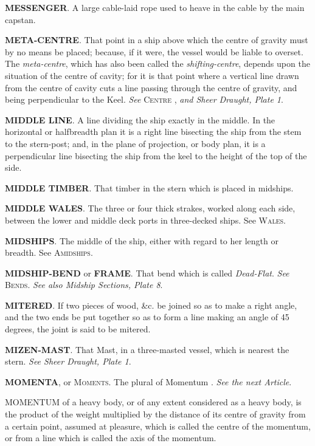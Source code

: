 \textbf{MESSENGER}. A large cable-laid rope used to heave in the cable by the main capstan. 

\textbf{META-CENTRE}. That point in a ship above which the centre of gravity must by no means be placed; because, if it were, the vessel would be liable to overset. The \textit{meta-centre}, which has also been called the \textit{shifting-centre}, depends upon the situation of the centre of cavity; for it is that point where a vertical line drawn from the centre of cavity cuts a line passing through the centre of gravity, and being perpendicular to the Keel. \textit{See} \textsc{Centre} , \textit{and Sheer Draught, Plate 1}. 

\textbf{MIDDLE LINE}. A line dividing the ship exactly in the middle. In the horizontal or halfbreadth plan it is a right line bisecting the ship from the stem to the stern-post; and, in the plane of projection, or body plan, it is a perpendicular line bisecting the ship from the keel to the height of the top of the side. 

\textbf{MIDDLE TIMBER}. That timber in the stern which is placed in midships. 

\textbf{MIDDLE WALES}. The three or four thick strakes, worked along each side, between the lower and middle deck ports in three-decked ships. See \textsc{Wales}. 

\textbf{MIDSHIPS}. The middle of the ship, either with regard to her length or breadth. See \textsc{Amidships}. 

\textbf{MIDSHIP-BEND} or \textbf{FRAME}. That bend which is called \textit{Dead-Flat}. \textit{See} \textsc{Bends}. \textit{See also Midship Sections, Plate 8}. 

\textbf{MITERED}. If two pieces of wood, \&c. be joined so as to make a right angle, and the two ends be put together so as to form a line making an angle of 45 degrees, the joint is said to be mitered. 

\textbf{MIZEN-MAST}. That Mast, in a three-masted vessel, which is nearest the stern. \textit{See Sheer Draught, Plate 1}. 

\textbf{MOMENTA}, or \textsc{Moments}. The plural of Momentum . \textit{See the next Article}. 

MOMENTUM of a heavy body, or of any extent considered as a heavy body, is the product of the weight multiplied by the distance of its centre of gravity from a certain point, assumed at pleasure, which is called the centre of the momentum, or from a line which is called the axis of the momentum. 

